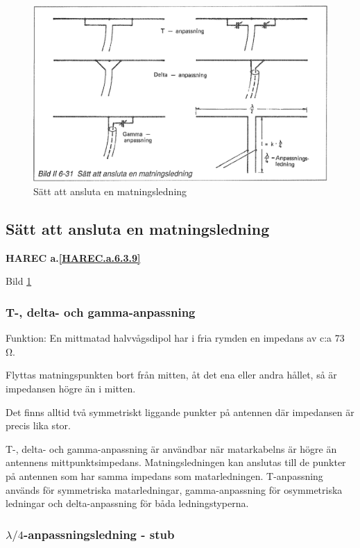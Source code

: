 \begin{figure}
  \includegraphics[width=\textwidth]{images/bild_2_6-31}
  \caption{Sätt att ansluta en matningsledning}
  \label{fig:bildII6-31}
\end{figure}

\subsection{Sätt att ansluta en matningsledning}
\textbf{
HAREC a.\ref{HAREC.a.6.3.9}\label{myHAREC.a.6.3.9}
}

Bild \ref{fig:bildII6-31}

\subsubsection{T-, delta- och gamma-anpassning}

Funktion: En mittmatad halvvågsdipol har i fria rymden en impedans av
c:a 73 Ω.

Flyttas matningspunkten bort från mitten, åt det ena eller andra
hållet, så är impedansen högre än i mitten.

Det finns alltid två symmetriskt liggande punkter på antennen där
impedansen är precis lika stor.

T-, delta- och gamma-anpassning är användbar när matarkabelns är högre
än antennens mittpunktsimpedans. Matningsledningen kan anslutas till
de punkter på antennen som har samma impedans som
matarledningen. T-anpassning används för symmetriska matarledningar,
gamma-anpassning för osymmetriska ledningar och delta-anpassning för
båda ledningstyperna.

\subsubsection{\(\lambda/4\)-anpassningsledning - stub}

